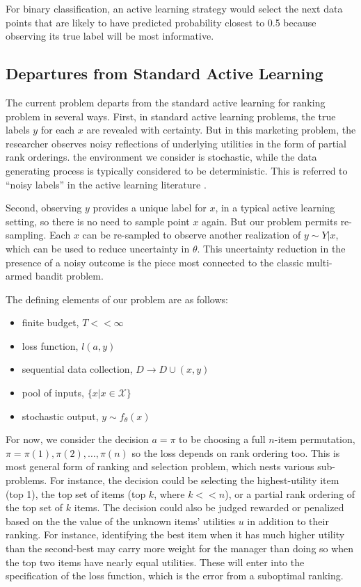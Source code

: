 \documentclass[a4paper,12pt]{article}
\newcommand{\numitems}{n}
\newcommand{\numtopset}{k}
\begin{document}
For binary classification, an active learning strategy would select the next data points that are likely to have predicted probability closest to 0.5 because observing its true label will be most informative.





\subsection{Departures from Standard Active Learning}

The current problem departs from the standard active learning for ranking problem in several ways. First, in standard active learning problems, the true labels $y$ for each $x$ are revealed with certainty. But in this marketing problem, the researcher observes noisy reflections of underlying utilities in the form of partial rank orderings. the environment we consider is stochastic, while the data generating process is typically considered to be deterministic. This is referred to ``noisy labels'' in the active learning literature \citep{NatarajanEtAl2013_noisy}.

Second, observing $y$ provides a unique label for $x$, in a typical active learning setting, so there is no need to sample point $x$ again. But our problem permits re-sampling. Each $x$ can be re-sampled to observe another realization of $y \sim Y|x$, which can be used to reduce uncertainty in $\theta$. This uncertainty reduction in the presence of a noisy outcome is the piece most connected to the classic multi-armed bandit problem. 

The defining elements of our problem are as follows:
\begin{itemize}
	\item finite budget, $T << \infty$
	\item loss function, $l(a,y)$
	\item sequential data collection, $D \to D \cup (x,y)$
	\item pool of inputs, $\{ x | x \in \mathcal{X} \}$
	\item stochastic output, $y \sim f_{\theta}(x)$
\end{itemize}

For now, we consider the decision $a=\pi$ to be choosing a full $\numitems$-item permutation, $\pi = \pi(1),\pi(2),\ldots,\pi(\numitems)$ so the loss depends on rank ordering too. This is most general form of ranking and selection problem, which nests various sub-problems. For instance, the decision could be selecting the highest-utility item (top 1), the top set of items (top $\numtopset$, where $\numtopset << \numitems$), or a partial rank ordering of the top set of $\numtopset$ items. The decision could also be judged rewarded or penalized based on the the value of the unknown items' utilities $u$ in addition to their ranking. For instance, identifying the best item when it has much higher utility than the second-best may carry more weight for the manager than doing so when the top two items have nearly equal utilities. These will enter into the specification of the loss function, which is the error from a suboptimal ranking.
\end{document}
